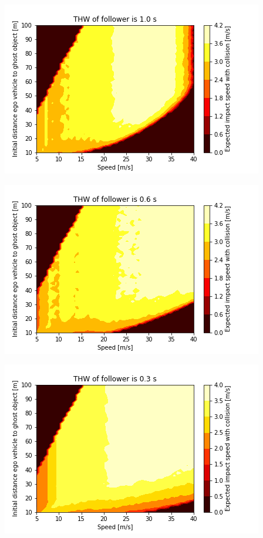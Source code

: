 \includegraphics[width=.9\linewidth]{figures/fp_vimpact_10_100_5_40_10.png}

\includegraphics[width=.9\linewidth]{figures/fp_vimpact_10_100_5_40_06.png}

\includegraphics[width=.9\linewidth]{figures/fp_vimpact_10_100_5_40_03.png}



